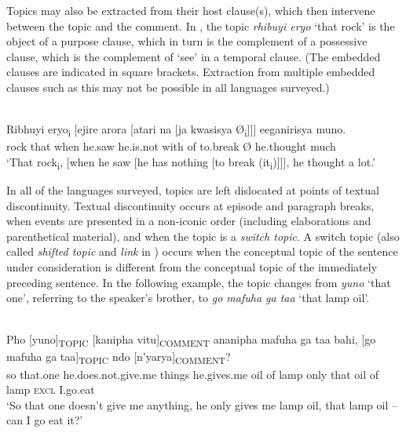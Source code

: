 \documentclass[output=paper]{langsci/langscibook}
\begin{document}
Topics may also be extracted from their host clause(s), which then intervene between the topic and the comment. In , the topic \textit{rhibuyi eryo} ‘that rock’ is the object of a purpose clause, which in turn is the complement of a possessive clause, which is the complement of ‘see’ in a temporal clause. (The embedded clauses are indicated in square brackets. Extraction from multiple embedded clauses such as this may not be possible in all languages surveyed.)

\ea\label{ex:6.nicolle}
\\
\gll Ribhuyi eryo\textsubscript{i} [ejire arora [atari na [ja kwasisya Ø\textsubscript{i}]]] eeganirisya muno.\\
rock that {\db}when he.saw he.is.not with {\db}of to.break Ø he.thought much\\
\glt ‘\textup{That rock}\textsubscript{i}\textup{, [when he saw [he has nothing [to break (it}\textsubscript{i}\textup{)]]], he thought a}\textup{ lot.’}
\z

In all of the languages surveyed, topics are left dislocated at points of textual discontinuity. Textual discontinuity occurs at episode and paragraph breaks, when events are presented in a non-iconic order (including elaborations and parenthetical material), and when the topic is a \textit{switch topic}. A switch topic (also called \textit{shifted topic} and \textit{link} in \citealt[109--110]{vallduvi1992}) occurs when the conceptual topic of the sentence under consideration is different from the conceptual topic of the immediately preceding sentence. In the following example, the topic changes from \textit{yuno} ‘that one’, referring to the speaker’s brother, to \textit{go mafuha ga taa} ‘that lamp oil’.

\ea\label{ex:7.nicolle}
\\
\gll Pho [yuno]\textsubscript{TOPIC} [kanipha vitu]\textsubscript{COMMENT} ananipha mafuha ga taa bahi, [go mafuha ga taa]\textsubscript{TOPIC} ndo [n’yarya]\textsubscript{COMMENT}?\\
so {\db}that.one {\db}he.does.not.give.me things he.gives.me oil of lamp only {\db}that oil of lamp \textsc{excl} {\db}I.go.eat\\
\glt \textup{‘So t}\textup{hat one doesn’t give me anything, he only gives me lamp oil, that lamp oil -- can I g}\textup{o eat it?’}
\z
\end{document}
